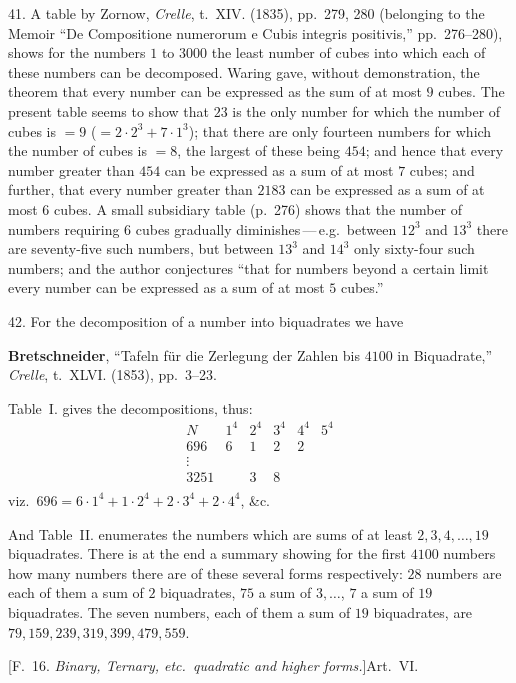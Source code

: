 \documentclass[11pt,a4paper]{article}
\begin{document}
41. A table by Zornow, \textit{Crelle}, t.~XIV. (1835), pp.~279, 280 (belonging to the Memoir ``De Compositione numerorum e Cubis integris positivis,'' pp.~276--280), shows for the numbers $1$ to $3000$ the least number of cubes into which each of these numbers can be decomposed. Waring gave, without demonstration, the theorem that every number can be expressed as the sum of at most $9$ cubes. The present table seems to show that $23$ is the only number for which the number of cubes is $= 9$ ($= 2 \cdot 2^{3} + 7 \cdot 1^{3}$); that there are only fourteen numbers for which the number of cubes is $= 8$, the largest of these being $454$; and hence that every number greater than $454$ can be expressed as a sum of at most $7$ cubes; and further, that every number greater than $2183$ can be expressed as a sum of at most $6$ cubes. A small subsidiary table (p.~276) shows that the number of numbers requiring $6$ cubes gradually diminishes\,---\,e.g.\ between $12^{3}$ and $13^{3}$ there are seventy-five such numbers, but between $13^{3}$ and $14^{3}$ only sixty-four such numbers; and the author conjectures ``that for numbers beyond a certain limit every number can be expressed as a sum of at most $5$ cubes.''

42. For the decomposition of a number into biquadrates we have

\textbf{Bretschneider}, ``Tafeln f\"ur die Zerlegung der Zahlen bis $4100$ in Biquadrate,'' \textit{Crelle}, t.~XLVI. (1853), pp.~3--23.

Table~I. gives the decompositions, thus:
\[
\begin{array}{c|ccccc}
N & 1^{4} & 2^{4} & 3^{4} & 4^{4} & 5^{4} \\
\hline
696 & 6 & 1 & 2 & 2 & \\
\vdots & & & & & \\
3251 & & 3 & 8 & & \\
\end{array}
\]
viz.\ $696 = 6 \cdot 1^{4} + 1 \cdot 2^{4} + 2 \cdot 3^{4} + 2 \cdot 4^{4}$, \&c.

And Table~II. enumerates the numbers which are sums of at least $2, 3, 4, \ldots, 19$ biquadrates. There is at the end a summary showing for the first $4100$ numbers how many numbers there are of these several forms respectively: $28$ numbers are each of them a sum of $2$ biquadrates, $75$ a sum of $3, \ldots$, $7$ a sum of $19$ biquadrates. The seven numbers, each of them a sum of $19$ biquadrates, are $79, 159, 239, 319, 399, 479, 559$.

\bigskip
\begin{center}
[F.~16. \textit{Binary, Ternary, etc.\ quadratic and higher forms.}]\quad Art.~VI.
\end{center}
\end{document}
